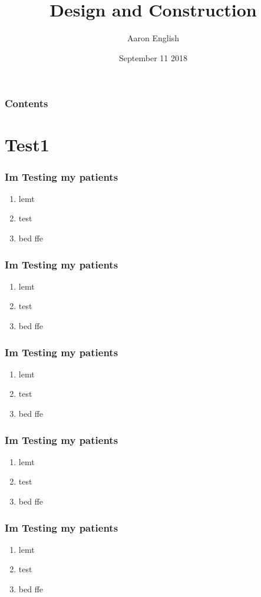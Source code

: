 \documentclass{beamer}
\title{Design and Construction}
\date[dddddd]{September 11 2018}
\author[Aaro]{Aaron English}
\begin{document}
    \begin{frame}[plain]
        \titlepage
    \end{frame}
    \begin{frame}[plain]
        \frametitle{Contents}
        \tableofcontents
    \end{frame}
    \section{Test1}    
        \begin{frame}
            \frametitle{Im Testing my patients}
            \begin{enumerate}
                \item<1-| alert@1> lemt 
                \item<2-> test
                \item<1-> bed ffe
            \end{enumerate}
        \end{frame}
        \begin{frame}
            \frametitle{Im Testing my patients}
            \begin{enumerate}
                \item<1-| alert@1> lemt 
                \item<2-> test
                \item<1-> bed ffe
            \end{enumerate}
        \end{frame}
        \begin{frame}
            \frametitle{Im Testing my patients}
            \begin{enumerate}
                \item<1-| alert@1> lemt 
                \item<2-> test
                \item<1-> bed ffe
            \end{enumerate}
        \end{frame}
        \begin{frame}
            \frametitle{Im Testing my patients}
            \begin{enumerate}
                \item<1-| alert@1> lemt 
                \item<2-> test
                \item<1-> bed ffe
            \end{enumerate}
        \end{frame}
        \begin{frame}
            \frametitle{Im Testing my patients}
            \begin{enumerate}
                \item<1-| alert@1> lemt 
                \item<2-> test
                \item<1-> bed ffe
            \end{enumerate}
        \end{frame}
\end{document}
